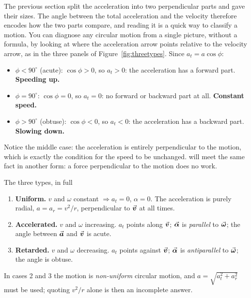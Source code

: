 The previous section split the acceleration into two perpendicular parts and gave their sizes. The
angle between the total acceleration and the velocity therefore encodes how the two parts compare, and
reading it is a quick way to classify a motion. You can diagnose any circular motion from a single picture, without a formula, by looking at where the
acceleration arrow points relative to the velocity arrow, as in the three panels of
Figure~\ref{fig:threetypes}. Since $a_t=a\cos\phi$:
\begin{itemize}
\item $\phi<90^\circ$ (acute): $\cos\phi>0$, so $a_t>0$: the acceleration has a forward part.
      \textbf{Speeding up.}
\item $\phi=90^\circ$: $\cos\phi=0$, so $a_t=0$: no forward or backward part at all.
      \textbf{Constant speed.}
\item $\phi>90^\circ$ (obtuse): $\cos\phi<0$, so $a_t<0$: the acceleration has a backward part.
      \textbf{Slowing down.}
\end{itemize}
Notice the middle case: the acceleration is entirely perpendicular to the motion, which is exactly the
condition for the speed to be unchanged.  will meet the same fact in another form: a
force perpendicular to the motion does no work.


\begin{figure}[htbp]
\centering
{}
\end{figure}

\begin{keybox}{The three types, in full}
\begin{enumerate}
\item \textbf{Uniform.} $v$ and $\omega$ constant $\Rightarrow a_t=0$, $\alpha=0$. The acceleration is
      purely radial, $a=a_r=v^{2}/r$, perpendicular to $\vec{\bm{v}}$ at all times.
\item \textbf{Accelerated.} $v$ and $\omega$ increasing. $a_t$ points along $\vec{\bm{v}}$; $\vec{\bm{\alpha}}$ is
      \emph{parallel} to $\vec{\bm{\omega}}$; the angle between $\vec{\bm{a}}$ and $\vec{\bm{v}}$ is acute.
\item \textbf{Retarded.} $v$ and $\omega$ decreasing. $a_t$ points against $\vec{\bm{v}}$; $\vec{\bm{\alpha}}$ is
      \emph{antiparallel} to $\vec{\bm{\omega}}$; the angle is obtuse.
\end{enumerate}
In cases 2 and 3 the motion is \emph{non-uniform} circular motion, and $a=\sqrt{a_t^{2}+a_r^{2}}$ must
be used; quoting $v^{2}/r$ alone is then an incomplete answer.
\end{keybox}

